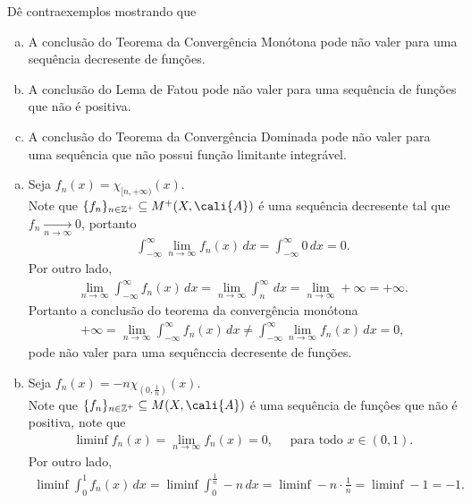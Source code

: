 \begin{homeworkProblem}[2]
  Dê contraexemplos mostrando que
  \begin{enumerate}[a)]
    \item A conclusão do Teorema da Convergência Monótona pode não valer para uma sequência decresente de funções.
    \item A conclusão do Lema de Fatou pode não valer para uma sequência de funções que não é positiva.
    \item A conclusão do Teorema da Convergência Dominada pode não valer para uma sequência que não possui função limitante integrável.
  \end{enumerate}
  \begin{solution}
  \begin{enumerate}[a)]
    \item Seja $f_n(x)=\chi_{[n,+\infty)}(x)$.\\
      Note que $\{f_n\}_{n\in\mathbb{Z}^{+}}\subseteq M^{+}(X,\cali{A})$ é uma sequência decresente tal que $f_n\xrightarrow[n\to\infty]{}0$, portanto
      \begin{align*}
        \int_{-\infty}^{\infty}\lim_{n \to \infty}f_n(x)\,dx=\int_{-\infty}^{\infty}0\,dx=0.
      \end{align*}
      Por outro lado,
      \begin{align*}
        \lim_{n \to \infty}\int_{-\infty}^{\infty}f_n(x)\,dx=\lim_{n \to \infty}\int_{n}^{\infty}\,dx=\lim_{n \to \infty}+\infty=+\infty.
      \end{align*}
      Portanto a conclusão do teorema da convergência monótona
      \begin{align*}
        +\infty=\lim_{n \to \infty}\int_{-\infty}^{\infty}f_n(x)\,dx\neq \int_{-\infty}^{\infty}\lim_{n \to \infty}f_n(x)\,dx=0,
      \end{align*}
      pode não valer para uma sequênccia decresente de funções.
    \item Seja $f_n(x)=-n\chi_{\left( 0,\frac{1}{n} \right)}(x)$.\\
      Note que $\{f_n\}_{n\in\mathbb{Z}^{+}}\subseteq M(X,\cali{A})$ é uma sequência de funçôes que não é positiva, note que
      \begin{align*}
        \liminf f_n(x)=\lim_{n \to \infty}f_n(x)=0,\quad\text{ para todo }x\in(0,1).
      \end{align*}
      Por outro lado,
      \begin{align*}
        \liminf \int_{0}^{1}f_n(x)\,dx=\liminf \int_{0}^{\frac{1}{n}}-n\,dx=\liminf -n\cdot\frac{1}{n}=\liminf -1=-1.

\end{align*}
\end{enumerate}
\end{solution}
\end{homeworkProblem}
